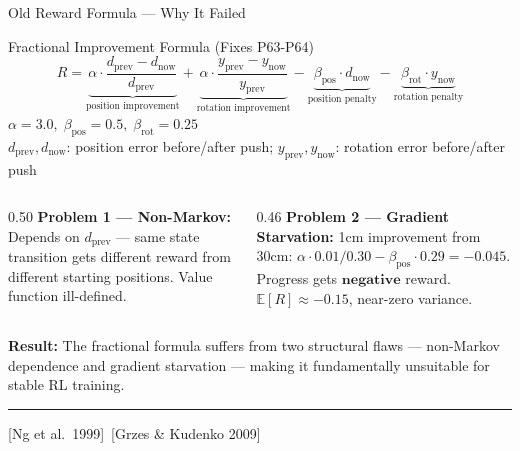 \documentclass[aspectratio=169,xcolor=dvipsnames,t]{beamer}
\newcommand{\litfooter}[1]{%
  \vspace{2pt}%
  \hrule%
  \vspace{2pt}%
  {\tiny\color{LightDarkGrey} #1}%
}
\begin{document}
\begin{frame}[t]{Old Reward Formula — Why It Failed}
  \begin{block}{Fractional Improvement Formula (Fixes P63-P64)}
    \[
    R = \underbrace{\alpha\!\cdot\!\frac{d_{\text{prev}}\!-\!d_{\text{now}}}{d_{\text{prev}}}}_{\text{position improvement}}
        + \underbrace{\alpha\!\cdot\!\frac{y_{\text{prev}}\!-\!y_{\text{now}}}{y_{\text{prev}}}}_{\text{rotation improvement}}
        - \underbrace{\beta_{\text{pos}}\!\cdot\!d_{\text{now}}}_{\text{position penalty}}
        - \underbrace{\beta_{\text{rot}}\!\cdot\!y_{\text{now}}}_{\text{rotation penalty}}
    \]
    {\small $\alpha=3.0,\;\beta_{\text{pos}}=0.5,\;\beta_{\text{rot}}=0.25$\\
    $d_{\text{prev}},d_{\text{now}}$: position error before/after push;\; $y_{\text{prev}},y_{\text{now}}$: rotation error before/after push}
  \end{block}

  \vspace{-6pt}
  \begin{columns}[T]
    \begin{column}{0.50\textwidth}
      {\footnotesize \textbf{Problem 1 — Non-Markov:} Depends on $d_{\text{prev}}$ — same state transition gets different reward from different starting positions. Value function ill-defined.}
    \end{column}
    \begin{column}{0.46\textwidth}
      {\footnotesize \textbf{Problem 2 — Gradient Starvation:} 1cm improvement from 30cm: \textcolor{hlred}{$\alpha\!\cdot\!0.01/0.30 - \beta_{\text{pos}}\!\cdot\!0.29 = \mathbf{-0.045}$}. Progress gets $\mathbf{negative}$ reward. $\mathbb{E}[R] \approx -0.15$, near-zero variance.}
    \end{column}
  \end{columns}

  \vspace{-2pt}
  {\footnotesize \textbf{Result:} The fractional formula suffers from two structural flaws — non-Markov dependence and gradient starvation — making it fundamentally unsuitable for stable RL training.}

  \vfill\litfooter{[Ng et al.\ 1999]~[Grzes \& Kudenko 2009]}
\end{frame}
\end{document}

